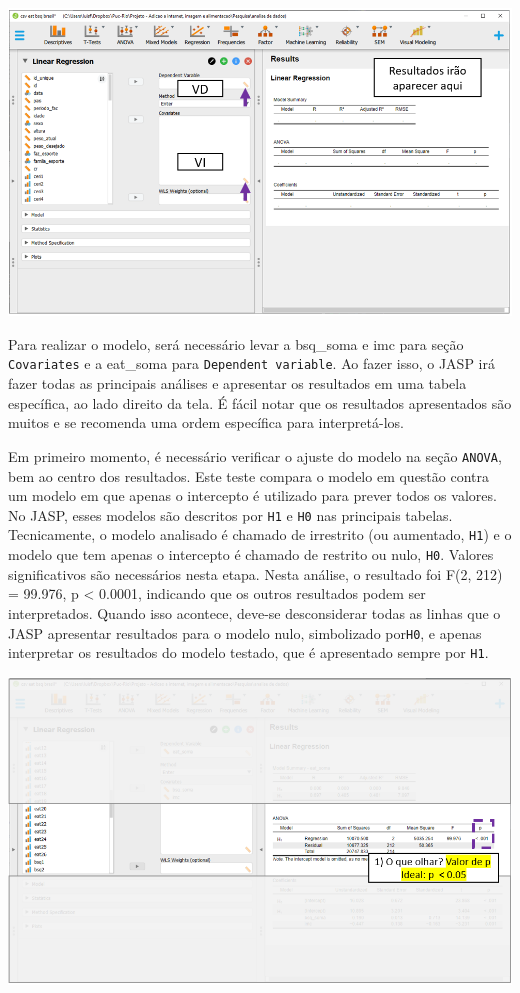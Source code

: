\documentclass[
]{book}
\begin{document}
\includegraphics{./img/cap_reg_interface.png}

Para realizar o modelo, será necessário levar a bsq\_soma e imc para seção \texttt{Covariates} e a eat\_soma para \texttt{Dependent\ variable}. Ao fazer isso, o JASP irá fazer todas as principais análises e apresentar os resultados em uma tabela específica, ao lado direito da tela. É fácil notar que os resultados apresentados são muitos e se recomenda uma ordem específica para interpretá-los.

Em primeiro momento, é necessário verificar o ajuste do modelo na seção \texttt{ANOVA}, bem ao centro dos resultados. Este teste compara o modelo em questão contra um modelo em que apenas o intercepto é utilizado para prever todos os valores. No JASP, esses modelos são descritos por \texttt{H1} e \texttt{H0} nas principais tabelas. Tecnicamente, o modelo analisado é chamado de irrestrito (ou aumentado, \texttt{H1}) e o modelo que tem apenas o intercepto é chamado de restrito ou nulo, \texttt{H0}. Valores significativos são necessários nesta etapa. Nesta análise, o resultado foi F(2, 212) = 99.976, p \textless{} 0.0001, indicando que os outros resultados podem ser interpretados. Quando isso acontece, deve-se desconsiderar todas as linhas que o JASP apresentar resultados para o modelo nulo, simbolizado por\texttt{H0}, e apenas interpretar os resultados do modelo testado, que é apresentado sempre por \texttt{H1}.

\includegraphics{./img/cap_reg_multipla_resultado_1.png}
\end{document}
